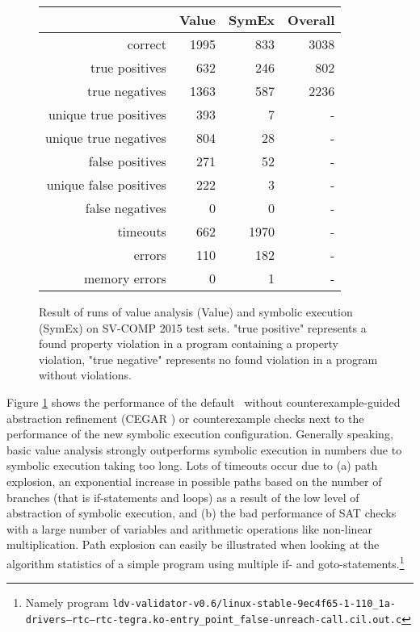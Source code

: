 \begin{figure}[h]
\begin{tabular}{| r || r | r | r |}
\hline
                     & Value & SymEx & Overall \\ \hline
correct                & 1995 &  833 & 3038 \\ \hline
true positives         &  632 &  246 &  802 \\ \hline
true negatives         & 1363 &  587 & 2236 \\ \hline
unique true positives  &  393 &    7 &    - \\ \hline
unique true negatives  &  804 &   28 &    - \\ \hline
false positives        &  271 &   52 &    - \\ \hline
unique false positives &  222 &    3 &    - \\ \hline
false negatives        &    0 &    0 &    - \\ \hline 
timeouts               &  662 & 1970 &    - \\ \hline
errors                 &  110 &  182 &    - \\ \hline
memory errors          &    0 &    1 &    - \\ \hline
\end{tabular}
\caption{Result of runs of value analysis (Value) and symbolic execution (SymEx) on SV-COMP 2015 test sets.
  "true positive" represents a found property violation in a program containing a property violation,
  "true negative" represents no found violation in a program without violations.}
\label{tab:diff}
\end{figure}
Figure \ref{tab:diff} shows the performance of the default \ without counterexample-guided abstraction refinement (CEGAR \cite{Beyer2013}) or counterexample checks next to the performance of the new symbolic execution configuration.
Generally speaking, basic value analysis strongly outperforms symbolic execution in numbers due to symbolic execution taking too long.
Lots of timeouts occur due to
(a) path explosion, an exponential increase in possible paths based on the number of branches (that is if-statements and loops) as a result of the low level of abstraction of symbolic execution, and
(b) the bad performance of SAT checks with a large number of variables and arithmetic operations like non-linear multiplication.
Path explosion can easily be illustrated when looking at the algorithm statistics of a simple program using multiple if- and goto-statements.\footnote{Namely program \texttt{ldv-validator-v0.6/linux-stable-9ec4f65-1-110\_1a-drivers--rtc--rtc-tegra.ko-entry\_point\_false-unreach-call.cil.out.c}}
